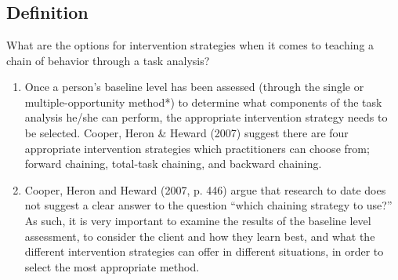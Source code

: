 \clearpage \section[\fourjThree{}]{\fourjThree{}%
              }
\subsection{Definition}
What are the options for intervention strategies when it comes to teaching a chain of behavior through a task analysis?
\begin{enumerate}
\item Once a person's baseline level has been assessed (through the single or multiple-opportunity method*) to determine what components of the task analysis he/she can perform, the appropriate intervention strategy needs to be selected. Cooper, Heron \& Heward (2007) suggest there are four appropriate intervention strategies which practitioners can choose from; forward chaining, total-task chaining, and backward chaining.
\item Cooper, Heron and Heward (2007, p. 446) argue that research to date does not suggest a clear answer to the question ``which chaining strategy to use?'' As such, it is very important to examine the results of the baseline level assessment, to consider the client and how they learn best, and what the different intervention strategies can offer in different situations, in order to select the most appropriate method.
\end{enumerate}


